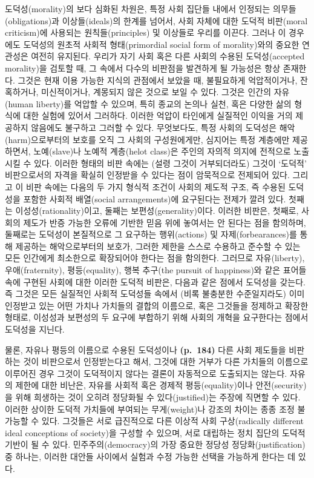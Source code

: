도덕성(morality)의 보다 심화된 차원은, 특정 사회 집단들 내에서 인정되는
의무들(obligations)과 이상들(ideals)의 한계를 넘어서, 사회 자체에 대한
도덕적 비판(moral criticism)에 사용되는 원칙들(principles) 및 이상들로
우리를 이끈다. 그러나 이 경우에도 도덕성의 원초적 사회적 형태(primordial
social form of morality)와의 중요한 연관성은 여전히 유지된다. 우리가
자기 사회 혹은 다른 사회의 수용된 도덕성(accepted morality)을 검토할 때,
그 속에서 다수의 비판점을 발견하게 될 가능성은 항상 존재한다. 그것은
현재 이용 가능한 지식의 관점에서 보았을 때, 불필요하게 억압적이거나,
잔혹하거나, 미신적이거나, 계몽되지 않은 것으로 보일 수 있다. 그것은
인간의 자유(human liberty)를 억압할 수 있으며, 특히 종교의 논의나 실천,
혹은 다양한 삶의 형식에 대한 실험에 있어서 그러하다. 이러한 억압이
타인에게 실질적인 이익을 거의 제공하지 않음에도 불구하고 그러할 수 있다.
무엇보다도, 특정 사회의 도덕성은 해악(harm)으로부터의 보호를 오직 그
사회의 구성원에게만, 심지어는 특정 계층에만 제공하면서, 노예(slave)나
노예적 계층(helot class)은 주인의 자의적 의지에 전적으로 노출시킬 수
있다. 이러한 형태의 비판 속에는 (설령 그것이 거부되더라도) 그것이
`도덕적' 비판으로서의 자격을 확실히 인정받을 수 있다는 점이 암묵적으로
전제되어 있다. 그리고 이 비판 속에는 다음의 두 가지 형식적 조건이 사회의
제도적 구조, 즉 수용된 도덕성을 포함한 사회적 배열(social
arrangements)에 요구된다는 전제가 깔려 있다. 첫째는
이성성(rationality)이고, 둘째는 보편성(generality)이다. 이러한 비판은,
첫째로, 사회의 제도가 반증 가능한 오류에 기반한 믿음 위에 놓여서는 안
된다는 점을 함의하며, 둘째로는 도덕성이 본질적으로 그 요구하는
행위(actions) 및 자제(forbearances)를 통해 제공하는 해악으로부터의
보호가, 그러한 제한을 스스로 수용하고 준수할 수 있는 모든 인간에게
최소한으로 확장되어야 한다는 점을 함의한다. 그러므로 자유(liberty),
우애(fraternity), 평등(equality), 행복 추구(the pursuit of happiness)와
같은 표어들 속에 구현된 사회에 대한 이러한 도덕적 비판은, 다음과 같은
점에서 도덕성을 갖는다. 즉 그것은 모든 실질적인 사회적 도덕성들 속에서
(비록 불충분한 수준일지라도) 이미 인정받고 있는 어떤 가치나 가치들의
결합의 이름으로, 혹은 그것들을 정제하고 확장한 형태로, 이성성과 보편성의
두 요구에 부합하기 위해 사회의 개혁을 요구한다는 점에서 도덕성을 지닌다.

물론, 자유나 평등의 이름으로 수용된 도덕성이나 \textbf{(p.~184)} 다른
사회 제도들을 비판하는 것이  비판으로서 인정받는다고
해서, 그것에 대한 거부가 다른 가치들의 이름으로 이루어진 경우 그것이
도덕적이지 않다는 결론이 자동적으로 도출되지는 않는다. 자유의 제한에
대한 비난은, 자유를 사회적 혹은 경제적 평등(equality)이나
안전(security)을 위해 희생하는 것이 오히려 정당화될 수 있다(justified)는
주장에 직면할 수 있다. 이러한 상이한 도덕적 가치들에 부여되는
무게(weight)나 강조의 차이는 종종 조정 불가능할 수 있다. 그것들은 서로
급진적으로 다른 이상적 사회 구상(radically different ideal conceptions
of society)을 구성할 수 있으며, 서로 대립하는 정치 집단의 도덕적 기반이
될 수 있다. 민주주의(democracy)의 가장 중요한 정당성
정당화(justification) 중 하나는, 이러한 대안들 사이에서 실험과 수정
가능한 선택을 가능하게 한다는 데 있다.

